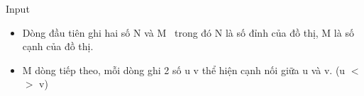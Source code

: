 Input
\begin{itemize}
	\item     Dòng đầu tiên ghi hai số N và M  trong đó N là số đỉnh của đồ thị, M là số cạnh của đồ thị.   
	\item     M dòng tiếp theo, mỗi dòng ghi 2 số u v thể hiện cạnh nối giữa u và v. (u $<$$>$ v)   
\end{itemize}